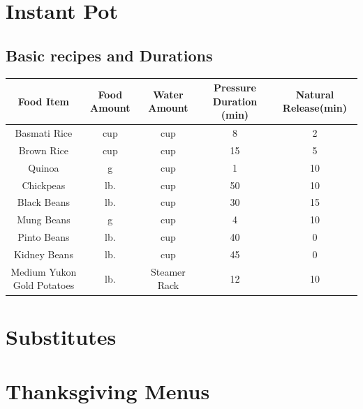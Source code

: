 \documentclass{article}
\begin{document}
\section{Instant Pot}
\subsection*{Basic recipes and Durations}
\begin{table}[H]
    \centering
    \begin{tabular}{ccccc}
        Food Item & Food Amount & Water Amount & Pressure Duration (min) & Natural Release(min) \\ \hline
        Basmati Rice & \unit[1]{cup} & \unit[1]{cup} & 8 & 2\\ \hline
        Brown Rice & \unit[1]{cup} & \unit[1]{cup} & 15 & 5 \\ \hline
        Quinoa & \unit[190]{g} & \unit[1]{cup} & 1 & 10 \\ \hline
        Chickpeas & \unit[1]{lb.} & \unit[6]{cup} & 50 & 10 \\ \hline
        Black Beans & \unit[1]{lb.} & \unit[6]{cup} & 30 & 15 \\ \hline
        Mung Beans & \unit[205]{g} & \unit[3]{cup} & 4 & 10 \\ \hline
	Pinto Beans & \unit[1]{lb.} & \unit[6]{cup} & 40 & 0 \\ \hline
        Kidney Beans & \unit[1]{lb.} & \unit[6]{cup} & 45 & 0 \\ \hline
	Medium Yukon Gold Potatoes & \unit[3-4]{lb.} & Steamer Rack & 12 & 10 \\
    \end{tabular}
    \label{tab:InstantPot}
\end{table}

\newpage


\newpage


\newpage


\newpage

\begin{appendices}        
\section{Substitutes}


\section{Thanksgiving Menus}


\printindex
\end{appendices}        
\end{document}
